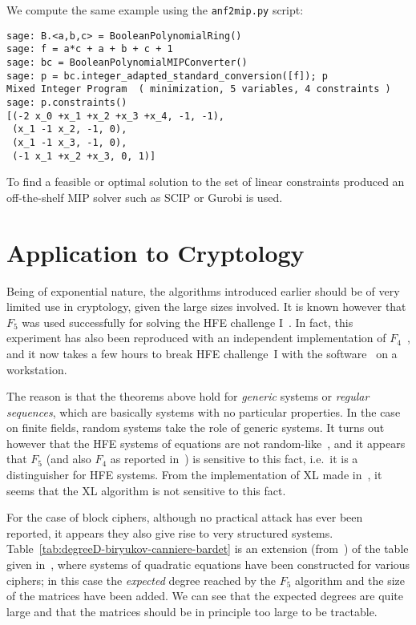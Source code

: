 We compute the same example using the \texttt{anf2mip.py} script:

\begin{lstlisting}
sage: B.<a,b,c> = BooleanPolynomialRing()
sage: f = a*c + a + b + c + 1
sage: bc = BooleanPolynomialMIPConverter()
sage: p = bc.integer_adapted_standard_conversion([f]); p
Mixed Integer Program  ( minimization, 5 variables, 4 constraints )
sage: p.constraints()
[(-2 x_0 +x_1 +x_2 +x_3 +x_4, -1, -1), 
 (x_1 -1 x_2, -1, 0), 
 (x_1 -1 x_3, -1, 0), 
 (-1 x_1 +x_2 +x_3, 0, 1)]
\end{lstlisting}

To find a feasible or optimal solution to the set of linear constraints produced an off-the-shelf MIP solver such as SCIP \cite{scip} or Gurobi \cite{gurobi} is used.

\section{Application to Cryptology}

Being of exponential nature, the algorithms introduced earlier should be of very limited use in cryptology, given the large sizes involved. It is known however that $F_5$ was used successfully for solving the HFE challenge I~\cite{faugere-joux:crypto03}. In fact, this experiment has also been reproduced with an independent implementation of $F_4$~\cite{steel:F404}, and it now takes a few hours to break HFE challenge~I with the \Magma software~\cite{magma} on a workstation.

The reason is that the theorems above hold for \emph{generic} systems or \emph{regular sequences}, which are basically systems with no particular properties. In the case on finite fields, random systems take the role of generic systems. It turns out however that the HFE systems of equations are not random-like~\cite{courtois:rsa2001,faugere-joux:crypto03}, and it appears that
$F_5$ (and also $F_4$ as reported in~\cite{steel:F404}) is sensitive to this fact, i.e.\ it is a distinguisher for HFE systems. From the implementation of XL made in~\cite{ars-faugere:asiacrypt04}, it seems that the XL algorithm is not sensitive to this fact.

For the case of block ciphers, although no practical attack has ever been reported, it appears they also give rise to very structured systems. Table~\ref{tab:degreeD-biryukov-canniere-bardet} is an extension (from~\cite{bardet:thesis2004}) of the table given in~\cite{biryukov-canniere:fse2003}, where systems of quadratic equations have been constructed for various ciphers; in this case the \emph{expected} degree reached by the $F_5$ algorithm and the size of the matrices have been added. We can see that the expected degrees are quite large and that the matrices should be in principle too large to be tractable.

